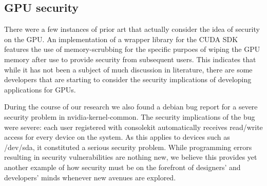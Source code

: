 \documentclass[letterpaper,10pt]{article}
\begin{document}
\begin{multicols}{2}
\subsection{GPU security}
 There were a few instances of prior art that actually consider the idea of security on the GPU.  An implementation of a wrapper library for the CUDA SDK features the use of memory-scrubbing for the specific purpoes of wiping the GPU memory after use to provide security from subsequent users\cite{cudawrapper}.  This indicates that while it has not been a subject of much discussion in literature, there are some developers that are starting to consider the security implications of developing applications for GPUs.
 
 During the course of our research we also found a debian bug report for a severe security problem in nvidia-kernel-common\cite{bugreport}.  The security implications of the bug were severe: each user registered with consolekit automatically receives read/write access for every device on the system.  As this applies to devices such as /dev/sda, it constituted a serious security problem.  While programming errors resulting in security vulnerabilities are nothing new, we believe this provides yet another example of how security must be on the forefront of designers' and developers' minds whenever new avenues are explored.


\end{multicols}
\end{document}
